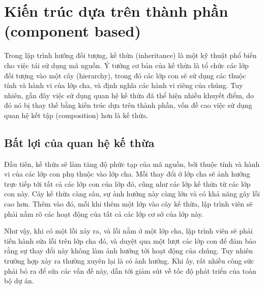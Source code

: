 \documentclass[12pt]{report}
\begin{document}
\section{Kiến trúc dựa trên thành phần (component based)}
Trong lập trình hướng đối tượng, kế thừa (inheritance) là một kỹ thuật phổ biến cho việc tái sử dụng mã nguồn. Ý tưởng cơ bản của kế thừa là tổ chức các lớp đối tượng vào một cây (hierarchy), trong đó các lớp con sẽ sử dụng các thuộc tính và hành vi của lớp cha, và định nghĩa các hành vi riêng của chúng. Tuy nhiên, gần đây việc sử dụng quan hệ kế thừa đã thể hiện nhiều khuyết điểm, do đó nó bị thay thế bằng kiến trúc dựa trên thành phần, vốn đề cao việc sử dụng quan hệ kết tập (composition) hơn là kế thừa.
\subsection{Bất lợi của quan hệ kế thừa}
Đầu tiên, kế thừa sẽ làm tăng độ phức tạp của mã nguồn, bởi thuộc tính và hành vi của các lớp con phụ thuộc vào lớp cha. Mỗi thay đổi ở lớp cha sẽ ảnh hưởng trực tiếp tới tất cả các lớp con của lớp đó, cũng như các lớp kế thừa từ các lớp con này. Cây kế thừa càng sâu, sự ảnh hưởng này càng lớn và có khả năng gây lỗi cao hơn. Thêm vào đó, mỗi khi thêm một lớp vào cây kế thừa, lập trình viên sẽ phải nắm rõ các hoạt động của tất cả các lớp cơ sở của lớp này.\cite{codecomplete}

Như vậy, khi có một lỗi xảy ra, và lỗi nằm ở một lớp cha, lập trình viên sẽ phải tiến hành sửa lỗi trên lớp cha đó, và duyệt qua một lượt các lớp con để đảm bảo rằng sự thay đổi này không làm ảnh hưởng tới hoạt động của chúng. Tuy nhiên trường hợp xảy ra thường xuyên lại là có ảnh hưởng. Khi ấy, rất nhiều công sức phải bỏ ra để sửa các vấn đề này, dẫn tới giảm sút về tốc độ phát triển của toàn bộ dự án.
\end{document}
